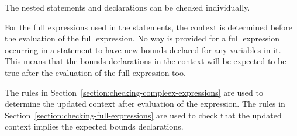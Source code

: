 The nested statements and declarations can be checked individually.

For the full expressions used in the statements, the context is determined
before the evaluation of the full expression. No way is provided for a
full expression occurring in a statement to have new bounds declared 
for any variables in it. This means that the bounds declarations in the
context will be expected to be true after the evaluation of the full expression too.

The rules in Section~\ref{section:checking-compleex-expressions}
are used to determine the updated context after evaluation of the
expression. The rules in Section~\ref{section:checking-full-expressions}
are used to check that the updated
context implies the expected bounds declarations.

